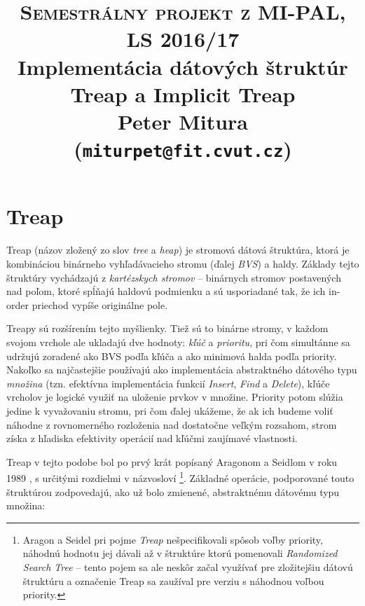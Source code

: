 \documentclass[a4paper, 12pt]{article}
\theoremstyle{definition}
\begin{document}
\title{\textsc{\large{Semestrálny projekt z MI-PAL, LS 2016/17}}\\
\vspace{1cm}
\large{Implementácia dátových štruktúr}\\
\Huge{Treap a Implicit Treap}\\
\vspace{1cm}
\normalsize{Peter Mitura (\texttt{miturpet@fit.cvut.cz})}}

\maketitle

\section{Treap}

Treap (názov zložený zo slov \emph{tree} a \emph{heap}) je stromová dátová
štruktúra, ktorá je kombináciou binárneho vyhľadávacieho stromu (ďalej
\emph{BVS}) a haldy.  Základy tejto štruktúry vychádzajú z \emph{kartézskych
stromov} \cite{cartesian} -- binárnych stromov postavených nad poľom, ktoré
spĺňajú haldovú podmienku a sú usporiadané tak, že ich in-order priechod vypíše
originálne pole.

Treapy sú rozšírením tejto myšlienky. Tiež sú to binárne stromy, v každom
svojom vrchole ale ukladajú dve hodnoty: \emph{kľúč} a \emph{prioritu}, pri čom
simultánne sa udržujú zoradené ako BVS podľa kľúča a ako minimová halda podľa
priority.  Nakoľko sa najčastejšie používajú ako implementácia abstraktného
dátového typu \emph{množina} (tzn. efektívna implementácia funkcií
\emph{Insert}, \emph{Find} a \emph{Delete}), kľúče vrcholov je logické využiť
na uloženie prvkov v množine. Priority potom slúžia jedine k vyvažovaniu
stromu, pri čom ďalej ukážeme, že ak ich budeme voliť náhodne z rovnomerného
rozloženia nad dostatočne veľkým rozsahom, strom získa z hľadiska efektivity
operácií nad kľúčmi zaujímavé vlastnosti.

Treap v tejto podobe bol po prvý krát popísaný Aragonom a Seidlom v roku 1989
\cite{treaps}, s určitými rozdielmi v názvosloví
\footnote{Aragon a Seidel
pri pojme \emph{Treap} nešpecifikovali spôsob voľby priority, náhodnú hodnotu
jej dávali až v štruktúre ktorú pomenovali \emph{Randomized Search Tree} --
tento pojem sa ale neskôr začal využívať pre zložitejšiu dátovú štruktúru a
označenie Treap sa zaužíval pre verziu s náhodnou voľbou priority.}.
Základné operácie, podporované touto štruktúrou zodpovedajú, ako už bolo
zmienené, abstraktnému dátovému typu množina:
\end{document}

